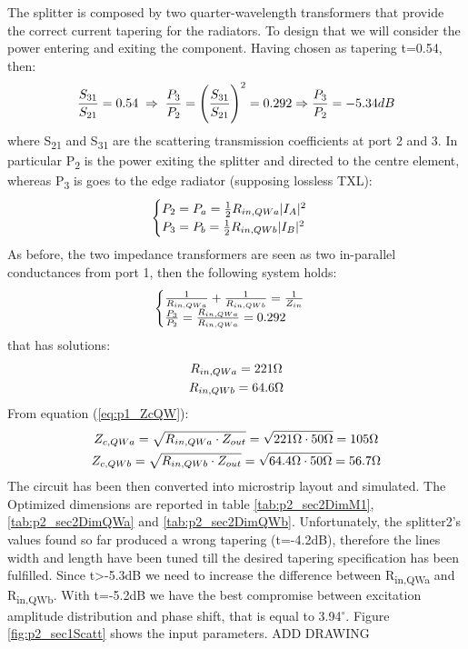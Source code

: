 The splitter is composed by two quarter-wavelength transformers that provide the correct current tapering for the radiators. To design that we will consider the power entering and exiting the component.
Having chosen as tapering t=0.54, then:
\begin{equation}
	\frac{S_{31}}{S_{21}}=0.54 \; \Rightarrow \; \frac{P_3}{P_2}=\Bigg(\frac{S_{31}}{S_{21}}\Bigg)^2=0.292 \Rightarrow \frac{P_3}{P_2}=-5.34dB \notag
\end{equation} 
where S\textsubscript{21} and S\textsubscript{31} are the scattering transmission coefficients at port 2 and 3. In particular P\textsubscript{2} is the power exiting the splitter and directed to the centre element, whereas P\textsubscript{3} is goes to the edge radiator (supposing lossless TXL):
\begin{equation}
	\begin{cases}
		P_2 = P_a = \frac{1}{2}R_{in,QWa}|I_A|^2 \notag \\	
		P_3 = P_b = \frac{1}{2}R_{in,QWb}|I_B|^2 \notag	
	\end{cases}	
\end{equation}
As before, the two impedance transformers are seen as two in-parallel conductances from port 1, then the following system holds: 
\begin{equation}
	\begin{cases} 
		\frac{1}{R_{in,QWa}}+\frac{1}{R_{in,QWb}}=\frac{1}{Z_{in}} \notag\\
		\frac{P_{3}}{P_{2}}=\frac{R_{in,QWa}}{R_{in,QWa}}=0.292 \notag
	\end{cases}
\end{equation}
that has solutions:
\begin{gather}
	R_{in,QWa} = 221\Omega \notag \\
	R_{in,QWb} = 64.6\Omega \notag
\end{gather}
From equation (\ref{eq:p1_ZcQW}):
\begin{gather}
	Z_{c,QWa}=\sqrt{R_{in,QWa}\cdot Z_{out}}=\sqrt{221\Omega \cdot 50\Omega}=105\Omega \notag \\
	Z_{c,QWb}=\sqrt{R_{in,QWb}\cdot Z_{out}}=\sqrt{64.4\Omega \cdot 50\Omega}=56.7\Omega \notag
\end{gather}
The circuit has been then converted into microstrip layout and simulated. The Optimized dimensions are reported in table \ref{tab:p2_sec2DimM1}, \ref{tab:p2_sec2DimQWa} and \ref{tab:p2_sec2DimQWb}. Unfortunately, the splitter2's values found so far produced a wrong tapering (t=-4.2dB), therefore the lines width and length have been tuned till the desired tapering specification has been fulfilled. Since t>-5.3dB we need to increase the difference between R\textsubscript{in,QWa} and R\textsubscript{in,QWb}. 
With t=-5.2dB we have the best compromise between excitation amplitude distribution and phase shift, that is equal to 3.94$^\circ$.
 Figure \ref{fig:p2_sec1Scatt} shows the input parameters. ADD DRAWING

